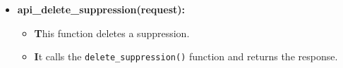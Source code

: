 \documentclass{report}
\begin{document}
\begin{itemize}
\begin{itemize}
\begin{itemize}
                  \item \textbf{api\_delete\_suppression(request):}
                    \begin{itemize}
                      \item \textbf This function deletes a suppression.
                      \item \textbf It calls the \texttt{delete\_suppression()} function and returns the response.
                    \end{itemize}
                \end{itemize}             
    \end{itemize}
\end{itemize}
\end{document}
